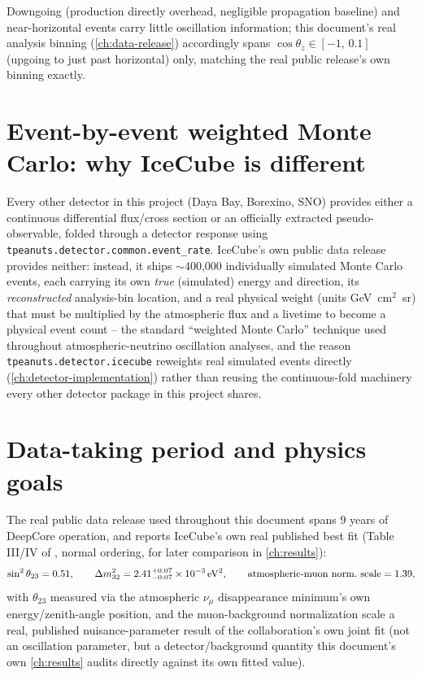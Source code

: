\begin{notebox}
Downgoing (production directly overhead, negligible propagation baseline)
and near-horizontal events carry little oscillation information; this
document's real analysis binning (\cref{ch:data-release}) accordingly
spans $\cos\theta_z\in[-1,\,0.1]$ (upgoing to just past horizontal) only,
matching the real public release's own binning exactly.
\end{notebox}

\section{Event-by-event weighted Monte Carlo: why IceCube is different}
\label{sec:weighted-mc-intro}

\begin{theorybox}
Every other detector in this project (Daya Bay, Borexino, SNO) provides
either a continuous differential flux/cross section or an officially
extracted pseudo-observable, folded through a detector response using
\texttt{tpeanuts.detector.common.event\_rate}. IceCube's own public data
release provides neither: instead, it ships $\sim$400{,}000 individually
simulated Monte Carlo events, each carrying its own \emph{true} (simulated)
energy and direction, its \emph{reconstructed} analysis-bin location, and a
real physical weight (units GeV~cm$^2$~sr) that must be multiplied by the
atmospheric flux and a livetime to become a physical event count -- the
standard ``weighted Monte Carlo'' technique used throughout atmospheric-neutrino
oscillation analyses, and the reason \texttt{tpeanuts.detector.icecube}
reweights real simulated events directly (\cref{ch:detector-implementation})
rather than reusing the continuous-fold machinery every other detector
package in this project shares.
\end{theorybox}

\section{Data-taking period and physics goals}

\begin{theorybox}
The real public data release used throughout this document spans 9 years
of DeepCore operation, and reports IceCube's own real published best fit
(Table III/IV of \cite{Abbasi2023IceCube}, normal ordering, for later
comparison in \cref{ch:results}):
\begin{equation}
  \sin^2\theta_{23} = 0.51, \qquad
  \Delta m^2_{32} = 2.41^{+0.07}_{-0.07}\times10^{-3}\,{\rm eV}^2, \qquad
  \text{atmospheric-muon norm.\ scale} = 1.39,
\end{equation}
with $\theta_{23}$ measured via the atmospheric $\nu_\mu$ disappearance
minimum's own energy/zenith-angle position, and the muon-background
normalization scale a real, published nuisance-parameter result of the
collaboration's own joint fit (not an oscillation parameter, but a
detector/background quantity this document's own \cref{ch:results} audits
directly against its own fitted value).
\end{theorybox}
